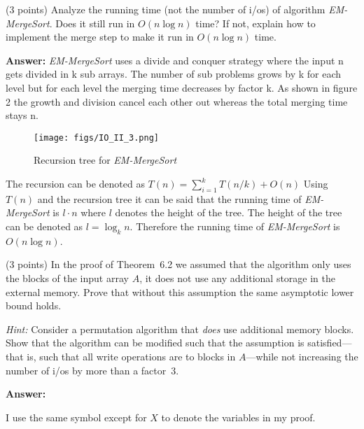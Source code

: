 \documentclass{article}
\newcommand{\io}{{\sc i/o}\xspace}
\newcommand{\ios}{{\io}s\xspace}
\newcounter{rcounter}
\newenvironment{rlist}%
{\begin{list}{\setnr-\arabic{rcounter}}{\usecounter{rcounter}}}{\end{list}}
\begin{document}
\begin{rlist}
\item (3 points)
    Analyze the running time (not the number of \ios) of algorithm \emph{EM-MergeSort}. Does it still run in $O(n\log n)$ time? If not, explain how to implement the merge step to make it run in $O(n\log n)$ time.
    
    \textbf{Answer:}
    \emph{EM-MergeSort} uses a divide and conquer strategy where the input n gets divided in k sub arrays. The number of sub problems grows by k for each level but for each level the merging time decreases by factor k. As shown in figure 2 the growth and division cancel each other out whereas the total merging time stays n. 
    \begin{figure}[H]
        \texttt{[image: figs/IO\_II\_3.png]}
        \caption{Recursion tree for \emph{EM-MergeSort}}
        \label{fig:io-ii-3}
    \end{figure}
    The recursion can be denoted as $T(n) = \sum\limits_{i=1}^k T(n/k) + O(n)$
   Using $T(n)$ and the recursion tree it can be said that the running time of \emph{EM-MergeSort} is $l \cdot n$ where $l$ denotes the height of the tree. The height of the tree can be denoted as $l = \log_k n$. Therefore the running time of \emph{EM-MergeSort} is  $O(n\log n)$.

\item(3 points)
    In the proof of Theorem~6.2 we assumed that the algorithm only uses the blocks of the input array $A$, it does not use any additional storage in the external memory. Prove that without this assumption the same asymptotic lower bound holds.

    \emph{Hint:} Consider a permutation algorithm that \emph{does} use additional memory blocks. Show that the algorithm can be modified such that the assumption is satisfied---that is, such that all write operations are to blocks in $A$---while not increasing the number of \ios by more than a factor~3.
    
    \textbf{Answer:}
        
        I use the same symbol except for $X$ to denote the variables in my proof.
        

\end{rlist}
\end{document}
